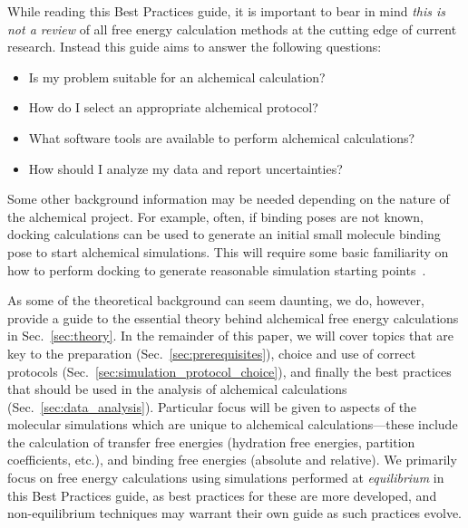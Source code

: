 \documentclass[9pt,bestpractices]{livecoms}
\begin{document}
 While reading this Best Practices guide, it is important to bear in mind \emph{this is not a review} of all free energy calculation methods at the cutting edge of current research.
Instead this guide aims to answer the following questions:
\begin{itemize}
    \item Is my problem suitable for an alchemical calculation? 
     \item How do I select an appropriate alchemical protocol? 
     \item What software tools are available to perform alchemical calculations? 
     \item How should I analyze my data and report uncertainties? 
\end{itemize}


Some other background information may be needed depending on the nature of the alchemical project. For example, often, if binding poses are not known, docking calculations can be used to generate an initial small molecule binding pose to start alchemical simulations. This will require some basic familiarity on how to perform docking to generate reasonable simulation starting points~\cite{grinter2014challenges}. 

As some of the theoretical background can seem daunting, we do, however, provide a guide to the essential theory behind alchemical free energy calculations in Sec.~\ref{sec:theory}.
In the remainder of this paper, we will cover topics that are key to the preparation (Sec.~\ref{sec:prerequisites}), choice and use of correct protocols (Sec.~\ref{sec:simulation_protocol_choice}), and finally the best practices that should be used in the analysis of alchemical calculations (Sec.~\ref{sec:data_analysis}). 
Particular focus will be given to aspects of the molecular simulations which are unique to alchemical calculations---these include the calculation of transfer free energies (hydration free energies, partition coefficients, etc.), and binding free energies (absolute and relative). We primarily focus on free energy calculations using simulations performed at \emph{equilibrium} in this Best Practices guide, as best practices for these are more developed, and non-equilibrium techniques may warrant their own guide as such practices evolve. 
\end{document}
